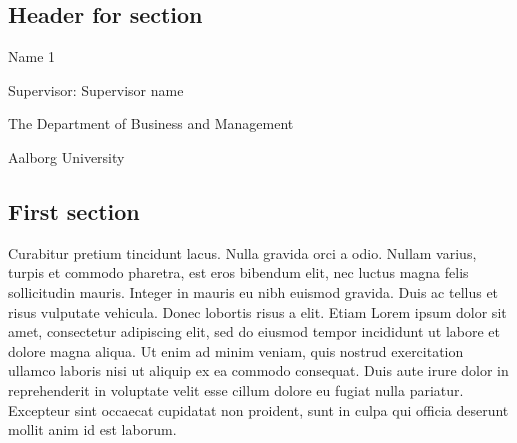 \documentclass[10pt,twoside]{article}
\begin{document}
\begin{centering}

\vspace{1 cm}

\Huge

\section*{Header for section}
\addtocounter{section}{1}

\vspace{1 cm}

\Large
Name 1

\normalsize
Supervisor: Supervisor name

\vspace{1 cm}

\Large


\vspace{1 cm}

\normalsize
The Department of Business and Management

Aalborg University

\vspace{1 cm}

\end{centering}

\FloatBarrier
\newpage


\hypertarget{sec:part2-sec1}{%
\subsection{First section}\label{sec:part2-sec1}}

Curabitur pretium tincidunt lacus. Nulla gravida orci a odio. Nullam
varius, turpis et commodo pharetra, est eros bibendum elit, nec luctus
magna felis sollicitudin mauris. Integer in mauris eu nibh euismod
gravida. Duis ac tellus et risus vulputate vehicula. Donec lobortis
risus a elit. Etiam Lorem ipsum dolor sit amet, consectetur adipiscing
elit, sed do eiusmod tempor incididunt ut labore et dolore magna aliqua.
Ut enim ad minim veniam, quis nostrud exercitation ullamco laboris nisi
ut aliquip ex ea commodo consequat. Duis aute irure dolor in
reprehenderit in voluptate velit esse cillum dolore eu fugiat nulla
pariatur. Excepteur sint occaecat cupidatat non proident, sunt in culpa
qui officia deserunt mollit anim id est laborum.
\end{document}
